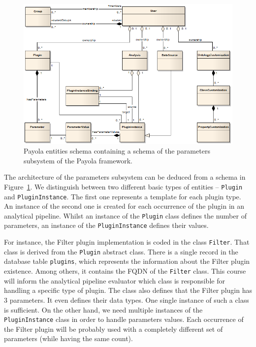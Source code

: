 \begin{figure}
	\centering
	\includegraphics[width=140mm]{img/params-schema.png}
	\caption{Payola entities schema containing a schema of the parameters 
	subsystem of the Payola framework.~\cite{payola:dg}}
	\label{fig:params-schema}
\end{figure}

The architecture of the parameters subsystem can be deduced
from a schema in Figure~\ref{fig:params-schema}. We distinguish between two 
different basic types of entities -- \texttt{Plugin} and \texttt{PluginInstance}. The first 
one represents a template for each plugin type. An instance of the second one is created for
each occurrence of the plugin in an analytical pipeline. Whilst an instance of the \texttt{Plugin}
class defines the number of parameters, an instance of the \texttt{PluginInstance} 
defines their values.

For instance, the Filter plugin implementation is coded in the class \texttt{Filter}.
That class is derived from the \texttt{Plugin} abstract class. There is a single record in the database table
\texttt{plugins}, which represents the information about the Filter plugin existence.
Among others, it contains the FQDN of the \texttt{Filter} class. This course will inform the analytical
pipeline evaluator which class is responsible for handling
a specific type of plugin. The class also defines that the Filter plugin has 3 parameters. It even 
defines their data types. One single instance of such a class is sufficient. On the other hand, we need
multiple instances of the \texttt{PluginInstance} class in order to
handle parameters values. Each occurrence of the Filter plugin will be probably 
used with a completely different set of parameters (while having the same count).

